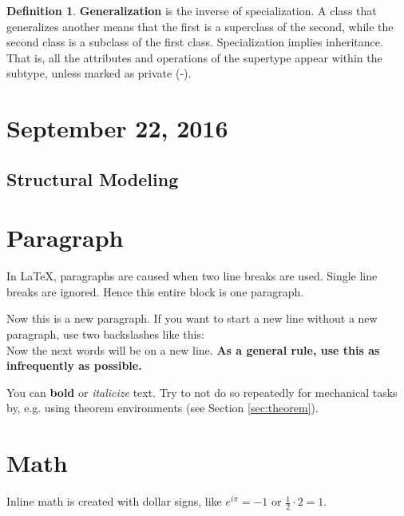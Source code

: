 \documentclass[11pt]{article}
\theoremstyle{plain} %
\theoremstyle{definition}
\newtheorem*{definition}{Definition} %
\theoremstyle{example}
\theoremstyle{remark}
\newcommand{\half}{\frac{1}{2}}
\begin{document}
\begin{definition}
\textbf{Generalization} is the inverse of specialization. A class that generalizes another means that the first is a superclass of the second, while the second class is a subclass of the first class. Specialization implies inheritance. That is, all the attributes and operations of the supertype appear within the subtype, unless marked as private (-). 
\end{definition}



\section{September 22, 2016}

\subsection{Structural Modeling}






















\section{Paragraph}
In \LaTeX, paragraphs are caused
when two line breaks are used.
Single line breaks are ignored.
Hence this entire block is one paragraph.

Now this is a new paragraph. If you want to
start a new line without a new paragraph, use
two backslashes like this:
\\
Now the next words will be on a new line.
\textbf{As a general rule, use this as infrequently as possible.}

You can \textbf{bold} or \textit{italicize} text.
Try to not do so repeatedly for mechanical tasks by, e.g. using theorem environments (see Section \ref{sec:theorem}).


\section{Math}
Inline math is created with dollar signs,
like $e^{i \pi} = -1$ or $\half \cdot 2 = 1$.
\end{document}
